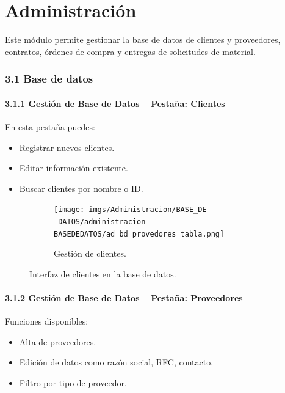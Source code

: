 \chapter{Administración }


Este módulo permite gestionar la base de datos de clientes y proveedores, contratos, órdenes de compra y entregas de solicitudes de material.
\newpage
\pagestyle{fancy}

\subsection{3.1 Base de datos}

\subsubsection{3.1.1 Gestión de Base de Datos – Pestaña: Clientes}

En esta pestaña puedes:

\begin{itemize}
    \item Registrar nuevos clientes.
    \item Editar información existente.
    \item Buscar clientes por nombre o ID.
\end{itemize}

\begin{figure}[h]
\centering
\begin{subfigure}{0.4\textwidth}
    \texttt{[image: imgs/Administracion/BASE\_DE \_DATOS/administracion-BASEDEDATOS/ad\_bd\_provedores\_tabla.png]}
    \caption{Gestión de clientes.}
    \label{fig:admin1}
\end{subfigure}
\caption{Interfaz de clientes en la base de datos.}
\end{figure}

\subsubsection{3.1.2 Gestión de Base de Datos – Pestaña: Proveedores}

Funciones disponibles:

\begin{itemize}
    \item Alta de proveedores.
    \item Edición de datos como razón social, RFC, contacto.
    \item Filtro por tipo de proveedor.
\end{itemize}

